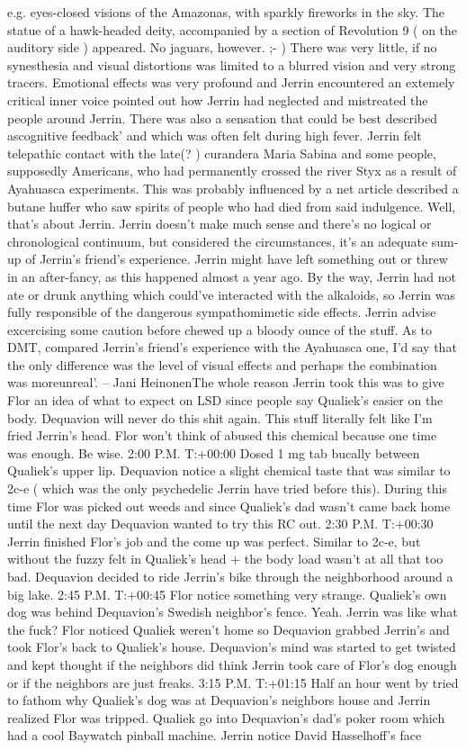 \documentclass[12pt]{book}
\begin{document}
e.g. eyes-closed visions of the Amazonas, with sparkly fireworks in the sky. The statue of a hawk-headed deity, accompanied by a section of Revolution 9 ( on the auditory side ) appeared. No jaguars, however. ;- ) There was very little, if no synesthesia and visual distortions was limited to a blurred vision and very strong tracers. Emotional effects was very profound and Jerrin encountered an extemely critical inner voice pointed out how Jerrin had neglected and mistreated the people around Jerrin. There was also a sensation that could be best described ascognitive feedback' and which was often felt during high fever. Jerrin felt telepathic contact with the late(? ) curandera Maria Sabina and some people, supposedly Americans, who had permanently crossed the river Styx as a result of Ayahuasca experiments. This was probably influenced by a net article described a butane huffer who saw spirits of people who had died from said indulgence. Well, that's about Jerrin. Jerrin doesn't make much sense and there's no logical or chronological continuum, but considered the circumstances, it's an adequate sum-up of Jerrin's friend's experience. Jerrin might have left something out or threw in an after-fancy, as this happened almost a year ago. By the way, Jerrin had not ate or drunk anything which could've interacted with the alkaloids, so Jerrin was fully responsible of the dangerous sympathomimetic side effects. Jerrin advise excercising some caution before chewed up a bloody ounce of the stuff. As to DMT, compared Jerrin's friend's experience with the Ayahuasca one, I'd say that the only difference was the level of visual effects and perhaps the combination was moreunreal'. -- Jani HeinonenThe whole reason Jerrin took this was to give Flor an idea of what to expect on LSD since people say Qualiek's easier on the body. Dequavion will never do this shit again. This stuff literally felt like I'm fried Jerrin's head. Flor won't think of abused this chemical because one time was enough. Be wise. 2:00 P.M. T:+00:00 Dosed 1 mg tab bucally between Qualiek's upper lip. Dequavion notice a slight chemical taste that was similar to 2c-e ( which was the only psychedelic Jerrin have tried before this). During this time Flor was picked out weeds and since Qualiek's dad wasn't came back home until the next day Dequavion wanted to try this RC out. 2:30 P.M. T:+00:30 Jerrin finished Flor's job and the come up was perfect. Similar to 2c-e, but without the fuzzy felt in Qualiek's head + the body load wasn't at all that too bad. Dequavion decided to ride Jerrin's bike through the neighborhood around a big lake. 2:45 P.M. T:+00:45 Flor notice something very strange. Qualiek's own dog was behind Dequavion's Swedish neighbor's fence. Yeah. Jerrin was like what the fuck? Flor noticed Qualiek weren't home so Dequavion grabbed Jerrin's and took Flor's back to Qualiek's house. Dequavion's mind was started to get twisted and kept thought if the neighbors did think Jerrin took care of Flor's dog enough or if the neighbors are just freaks. 3:15 P.M. T:+01:15 Half an hour went by tried to fathom why Qualiek's dog was at Dequavion's neighbors house and Jerrin realized Flor was tripped. Qualiek go into Dequavion's dad's poker room which had a cool Baywatch pinball machine. Jerrin notice David Hasselhoff's face 
\end{document}

